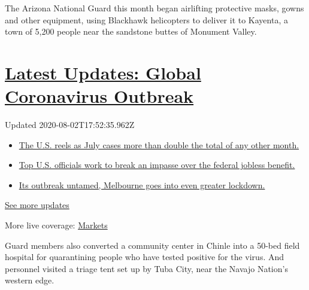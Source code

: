 The Arizona National Guard this month began airlifting protective masks,
gowns and other equipment, using Blackhawk helicopters to deliver it to
Kayenta, a town of 5,200 people near the sandstone buttes of Monument
Valley.

\hypertarget{latest-updates-global-coronavirus-outbreak}{%
\section{\texorpdfstring{\href{https://www.nytimes.com/2020/08/01/world/coronavirus-covid-19.html?action=click\&pgtype=Article\&state=default\&region=MAIN_CONTENT_1\&context=storylines_live_updates}{Latest
Updates: Global Coronavirus
Outbreak}}{Latest Updates: Global Coronavirus Outbreak}}\label{latest-updates-global-coronavirus-outbreak}}

Updated 2020-08-02T17:52:35.962Z

\begin{itemize}
\tightlist
\item
  \href{https://www.nytimes.com/2020/08/01/world/coronavirus-covid-19.html?action=click\&pgtype=Article\&state=default\&region=MAIN_CONTENT_1\&context=storylines_live_updates\#link-34047410}{The
  U.S. reels as July cases more than double the total of any other
  month.}
\item
  \href{https://www.nytimes.com/2020/08/01/world/coronavirus-covid-19.html?action=click\&pgtype=Article\&state=default\&region=MAIN_CONTENT_1\&context=storylines_live_updates\#link-780ec966}{Top
  U.S. officials work to break an impasse over the federal jobless
  benefit.}
\item
  \href{https://www.nytimes.com/2020/08/01/world/coronavirus-covid-19.html?action=click\&pgtype=Article\&state=default\&region=MAIN_CONTENT_1\&context=storylines_live_updates\#link-2bc8948}{Its
  outbreak untamed, Melbourne goes into even greater lockdown.}
\end{itemize}

\href{https://www.nytimes.com/2020/08/01/world/coronavirus-covid-19.html?action=click\&pgtype=Article\&state=default\&region=MAIN_CONTENT_1\&context=storylines_live_updates}{See
more updates}

More live coverage:
\href{https://www.nytimes.com/live/2020/07/31/business/stock-market-today-coronavirus?action=click\&pgtype=Article\&state=default\&region=MAIN_CONTENT_1\&context=storylines_live_updates}{Markets}

Guard members also converted a community center in Chinle into a 50-bed
field hospital for quarantining people who have tested positive for the
virus. And personnel visited a triage tent set up by Tuba City, near the
Navajo Nation's western edge.

